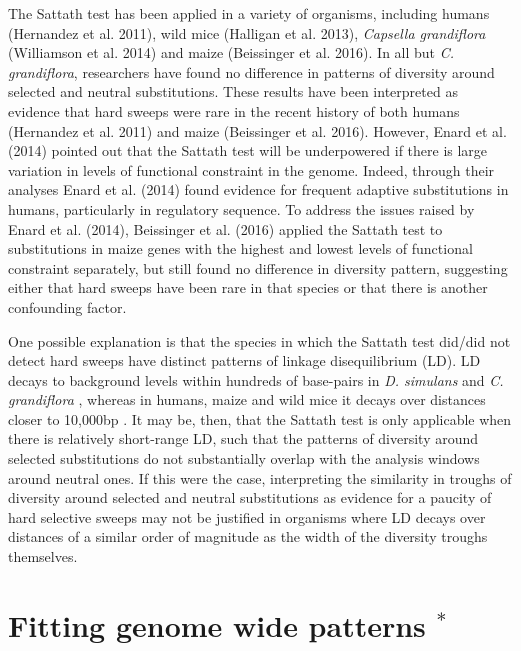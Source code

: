 The Sattath test has been applied in a variety of organisms, including humans (Hernandez et al. 2011), wild mice (Halligan et al. 2013), \textit{Capsella grandiflora} (Williamson et al. 2014) and maize (Beissinger et al. 2016). In all but \textit{C. grandiflora}, researchers have found no difference in patterns of diversity around selected and neutral substitutions. These results have been interpreted as evidence that hard sweeps were rare in the recent history of both humans (Hernandez et al. 2011) and maize (Beissinger et al. 2016). However, Enard et al. (2014) pointed out that the Sattath test will be underpowered if there is large variation in levels of functional constraint in the genome. Indeed, through their analyses Enard et al. (2014) found evidence for frequent adaptive substitutions in humans, particularly in regulatory sequence. To address the issues raised by Enard et al. (2014), Beissinger et al. (2016) applied the Sattath test to substitutions in maize genes with the highest and lowest levels of functional constraint separately, but still found no difference in diversity pattern, suggesting either that hard sweeps have been rare in that species or that there is another confounding factor.
 
One possible explanation is that the species in which the Sattath test did/did not detect hard sweeps have distinct patterns of linkage disequilibrium (LD). LD decays to background levels within hundreds of base-pairs in \textit{D. simulans} \citep{RN283} and \textit{C. grandiflora} \citep{RN271}, whereas in humans, maize and wild mice it decays over distances closer to 10,000bp \citep{RN273,RN327, RN272}. It may be, then, that the Sattath test is only applicable when there is relatively short-range LD, such that the patterns of diversity around selected substitutions do not substantially overlap with the analysis windows around neutral ones. If this were the case, interpreting the similarity in troughs of diversity around selected and neutral substitutions as evidence for a paucity of hard selective sweeps may not be justified in organisms where LD decays over distances of a similar order of magnitude as the width of the diversity troughs themselves.
   	        	  
\section[Fitting genome wide patterns]{Fitting genome wide patterns $^*$}

